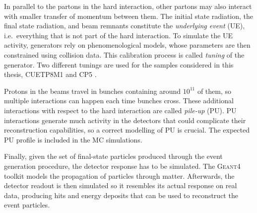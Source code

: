 \documentclass[../main.tex]{subfiles}
\begin{document}
In parallel to the partons in the hard interaction, other partons may also interact with smaller transfer of momentum between them. The initial state radiation, the final state radiation, and beam remnants constitute the \textit{underlying event} (UE), i.e.~everything that is not part of the hard interaction. To simulate the UE activity, generators rely on phenomenological models, whose parameters are then constrained using collision data. This calibration process is called \textit{tuning} of the generator. Two different tunings are used for the samples considered in this thesis, CUETP8M1 \cite{intro:theo:CUETP8M1} and CP5 \cite{intro:theo:CP5}.

Protons in the beams travel in bunches containing around $10^{11}$ of them, so multiple interactions can happen each time bunches cross. These additional interactions with respect to the hard interaction are called \textit{pile-up} (PU). PU interactions generate much activity in the detectors that could complicate their reconstruction capabilities, so a correct modelling of PU is crucial. The expected PU profile is included in the MC simulations.



Finally, given the set of final-state particles produced through the event generation procedure, the detector response has to be simulated. The \textsc{Geant4} toolkit \cite{geant} models the propagation of particles through matter. Afterwards, the detector readout is then simulated so it resembles its actual response on real data, producing hits and energy deposits that can be used to reconstruct the event particles.
\end{document}
